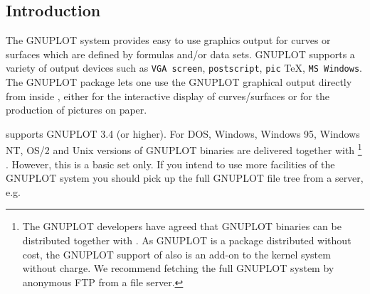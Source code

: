 



\iffalse
\newpage
  Gnuplot
\newpage
\title{GNUPLOT Interface for REDUCE\\Version 4}
\author{Herbert Melenk \\ 
Konrad--Zuse--Zentrum f\"ur Informationstechnik Berlin \\
E--mail: Melenk@zib.de}
\maketitle

\fi



\subsection{Introduction}

The GNUPLOT system provides easy to use graphics output 
for curves or surfaces which are defined by  
formulas and/or data sets. GNUPLOT supports 
a variety of output devices such as
\verb+VGA screen+, \verb+postscript+, \verb+pic+ \TeX,
\verb+MS Windows+.
The {\REDUCE} GNUPLOT package lets one use the GNUPLOT
graphical output directly from inside {\REDUCE}, either for
the interactive display of curves/surfaces or for the production
of pictures on paper. 

{\REDUCE} supports GNUPLOT 3.4 (or higher). 
For  DOS, Windows, Windows 95, Windows NT, OS/2
and Unix versions of {\REDUCE}
GNUPLOT binaries are delivered together with {\REDUCE}
\footnote{The GNUPLOT developers have agreed that GNUPLOT
binaries can be distributed together with {\REDUCE}.
As GNUPLOT is a package distributed without cost,
the GNUPLOT support of {\REDUCE} also is an
add-on to the {\REDUCE} kernel system without charge.
We recommend fetching the full GNUPLOT system 
by anonymous FTP from a file server.
} %
. However, this is a basic set only. 
If you intend to use more facilities of the GNUPLOT
system you should pick up the full GNUPLOT file tree
from a server, e.g.

